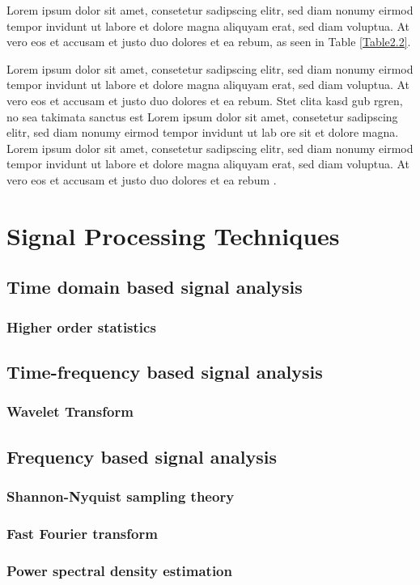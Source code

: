 Lorem ipsum dolor sit amet, consetetur sadipscing elitr, sed diam nonumy eirmod tempor invidunt ut labore et dolore magna aliquyam erat, sed diam voluptua. At vero eos et accusam et justo duo dolores et ea rebum, as seen in Table \ref{Table2.2}. 

Lorem ipsum dolor sit amet, consetetur sadipscing elitr, sed diam nonumy eirmod tempor invidunt ut labore et dolore magna aliquyam erat, sed diam voluptua. At vero eos et accusam et justo duo dolores et ea rebum. Stet clita kasd gub rgren, no sea takimata sanctus est Lorem ipsum dolor sit amet, consetetur sadipscing elitr, sed diam nonumy eirmod tempor invidunt ut lab ore sit et dolore magna. Lorem ipsum dolor sit amet, consetetur sadipscing elitr, sed diam nonumy eirmod tempor invidunt ut labore et dolore magna aliquyam erat, sed diam voluptua. At vero eos et accusam et justo duo dolores et ea rebum \cite{Roberts_Jackson_1991}. 

\section{Signal Processing Techniques}
\subsection{Time domain based signal analysis}
\subsubsection{Higher order statistics}
\subsection{Time-frequency based signal analysis}
\subsubsection{Wavelet Transform}
\subsection{Frequency based signal analysis}
\subsubsection{Shannon-Nyquist sampling theory}
\subsubsection{Fast Fourier transform}
\subsubsection{Power spectral density estimation}

